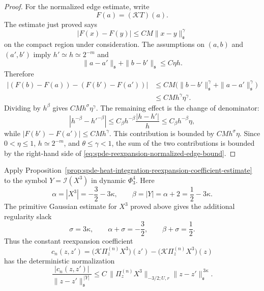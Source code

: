 \begin{proof}
For the normalized edge estimate, write
\[
  F(a)=(\mathcal KT)(a).
\]
The estimate just proved says
\begin{equation}
  |F(x)-F(y)|\leq CM\|x-y\|_{\mathfrak s}^{\gamma}
  \label{eq:spde-reexpansion-F-holder}
\end{equation}
on the compact region under consideration.  The assumptions on
\((a,b)\) and \((a',b')\) imply \(h'\simeq h\simeq2^{-m}\) and
\begin{equation}
  \|a-a'\|_{\mathfrak s}+\|b-b'\|_{\mathfrak s}
  \leq
  C\eta h .
  \label{eq:spde-reexpansion-edge-geometry}
\end{equation}
Therefore
\[
\begin{aligned}
  |(F(b)-F(a))-(F(b')-F(a'))|
  &\leq
  CM\bigl(\|b-b'\|_{\mathfrak s}^{\gamma}
          +\|a-a'\|_{\mathfrak s}^{\gamma}\bigr)       \\
  &\leq
  CMh^\gamma\eta^\gamma .
\end{aligned}
\]
Dividing by \(h^\beta\) gives \(CMh^\sigma\eta^\gamma\).  The remaining
effect is the change of denominator:
\[
  |h^{-\beta}-{h'}^{-\beta}|
  \leq
  C_\beta h^{-\beta}\frac{|h-h'|}{h}
  \leq
  C_\beta h^{-\beta}\eta ,
\]
while \(|F(b')-F(a')|\leq CMh^\gamma\).  This contribution is bounded by
\(CMh^\sigma\eta\).  Since \(0<\eta\leq1\), \(h\simeq2^{-m}\), and
\(\theta\leq\gamma<1\), the sum of the two contributions is bounded by the
right-hand side of
\eqref{eq:spde-reexpansion-normalized-edge-bound}.
\end{proof}

Apply
Proposition~\ref{prop:spde-heat-integration-reexpansion-coefficient-estimate}
to the symbol \(Y=\mathcal I(X^3)\) in dynamic \(\Phi^4_3\).  Here
\[
  \alpha=|X^3|=-\frac32-3\kappa,\qquad
  \beta=|Y|=\alpha+2=\frac12-3\kappa .
\]
The primitive Gaussian estimate for \(X^3\) proved above gives the additional
regularity slack
\[
  \sigma=3\kappa,
  \qquad
  \alpha+\sigma=-\frac32,
  \qquad
  \beta+\sigma=\frac12 .
\]
Thus the constant reexpansion coefficient
\begin{equation}
  c_n(z,z')
  =
  \bigl(\mathcal K\Pi_z^{(n)}X^3\bigr)(z')
  -
  \bigl(\mathcal K\Pi_z^{(n)}X^3\bigr)(z)
  \label{eq:spde-cn-from-x3-coordinate}
\end{equation}
has the deterministic normalization
\begin{equation}
  \frac{|c_n(z,z')|}
       {\|z-z'\|_{\mathfrak s}^{\,|Y|}}
  \leq
  C\,\|\Pi_z^{(n)}X^3\|_{-3/2;U,r}
  \|z-z'\|_{\mathfrak s}^{\,3\kappa}.
  \label{eq:spde-cn-scale-slack-from-x3}
\end{equation}

